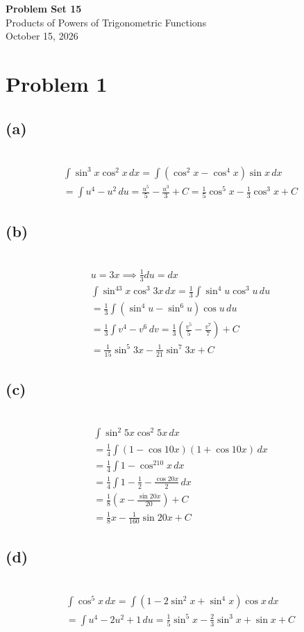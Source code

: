 \documentclass[12pt]{article}
\newcommand{\problem}[1]{\section{Problem #1}}
\newcommand{\subproblem}[1]{\subsection{(#1)} \,}
\begin{document}
\vspace*{0cm}

\begin{center}
    {\Large \bfseries Problem Set 15} \\[0.5cm]
    {\large Products of Powers of Trigonometric Functions} \\[0.35cm]
    {\normalsize October 15, 2026}
\end{center}


\problem{1}

\subproblem{a}
\begin{gather*}
    \int \sin^3 x\cos^2 x\, dx = \int (\cos^2 x-\cos ^4 x)\sin x\, dx\\
    =\int u^4-u^2\, du= \frac{u^5}{5}-\frac{u^3}{3}+C=\boxed{\frac{1}{5}\cos^5 x -\frac{1}{3}\cos^3x+C}
\end{gather*}

\subproblem{b}
\begin{gather*}
    u=3x \implies \frac{1}{3}du=dx\\
    \int \sin^43x\cos^3 3x\, dx = \frac{1}{3} \int \sin^4 u \cos^3 u\, du\\
    = \frac{1}{3} \int (\sin^4 u- \sin^6u)\cos u \, du\\
    =\frac{1}{3} \int v^4-v^6 \, dv = \frac{1}{3}(\frac{v^5}{5} - \frac{v^7}{7})+C\\
    = \boxed{\frac{1}{15} \sin^5 3x - \frac{1}{21} \sin^7 3x+C}
\end{gather*}

\subproblem{c}
\begin{gather*}
    \int \sin^2 5x\cos^2 5x\, dx\\
    =\frac{1}{4}\int (1-\cos 10x)(1+\cos 10x)\, dx\\
    =\frac{1}{4}\int 1-\cos^210x\, dx\\
    =\frac{1}{4} \int 1-\frac{1}{2} - \frac{\cos 20x}{2}\, dx\\
    =\frac{1}{8}(x-\frac{\sin 20x}{20})+C\\
    =\boxed{\frac{1}{8}x - \frac{1}{160} \sin 20x+C}
\end{gather*}

\subproblem{d}
\begin{gather*}
    \int \cos^5x \, dx = \int (1-2\sin^2x +\sin^4x)\cos x\, dx\\
    =\int u^4-2u^2+1\, du = \boxed{\frac{1}{5}\sin^5x -\frac{2}{3}\sin^3 x+\sin x+C}
\end{gather*}
\end{document}
